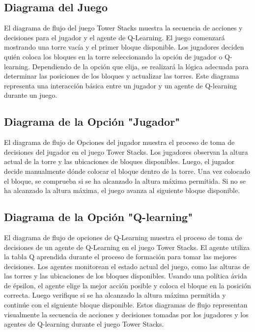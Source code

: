 \documentclass[a4paper]{article}
\begin{document}
\subsection{Diagrama del Juego}


El diagrama de flujo del juego  Tower Stacks muestra la secuencia de acciones y decisiones para el jugador y el agente de Q-Learning. El juego comenzará mostrando una torre vacía y el primer bloque disponible. Los jugadores deciden quién coloca los bloques en la torre seleccionando la opción de jugador o Q-learning. Dependiendo de la opción que elija, se realizará la lógica adecuada para determinar las posiciones de los bloques y actualizar las torres. Este diagrama representa una interacción básica entre un jugador y un agente de Q-learning durante un juego.

\subsection{Diagrama de la Opción "Jugador"}

El diagrama de flujo de Opciones del jugador muestra el proceso de toma de decisiones del jugador en el juego  Tower Stacks. Los jugadores observan la altura actual de la torre  y las ubicaciones de bloques disponibles. Luego, el jugador decide manualmente dónde colocar el bloque dentro de la torre. Una vez colocado el bloque, se comprueba si se ha alcanzado la altura máxima permitida. Si no se ha alcanzado la altura máxima, el juego avanza al siguiente bloque disponible.

\subsection{Diagrama de la Opción "Q-learning"}

El diagrama de flujo de opciones de Q-Learning muestra el proceso de toma de decisiones de un agente de Q-Learning en el juego  Tower Stacks. El agente utiliza la tabla Q aprendida durante el proceso de formación para tomar las mejores decisiones. Los agentes monitorean el estado actual del juego, como las alturas de las torres y las ubicaciones de los bloques disponibles. Usando una política ávida de épsilon, el agente elige la mejor acción posible y coloca el bloque en la posición correcta. Luego verifique si se ha alcanzado la altura máxima permitida y continúe con el siguiente bloque disponible.  Estos diagramas de flujo representan visualmente la secuencia de acciones y decisiones tomadas por los jugadores y los agentes de Q-learning durante el juego  Tower Stacks.
\end{document}
